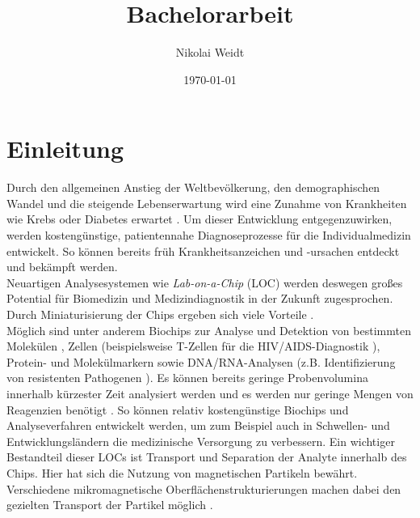 \documentclass[page,pdftex,12pt,a4paper,twoside,openright]{scrbook}
\author{Nikolai Weidt}
\date{\today}
\title{Bachelorarbeit}
\begin{document}
\maketitle
\setcounter{tocdepth}{2}
\tableofcontents


\chapter{Einleitung \label{sec-einleitung}}
\label{sec:org3c88a36}
Durch den allgemeinen Anstieg der Weltbevölkerung, den demographischen Wandel und die steigende Lebenserwartung wird eine Zunahme von Krankheiten wie Krebs oder Diabetes erwartet \cite{bray_global_2018,zhou_worldwide_2016}. Um dieser Entwicklung entgegenzuwirken, werden kostengünstige, patientennahe Diagnoseprozesse für die Individualmedizin entwickelt. So können bereits früh Krankheitsanzeichen und -ursachen entdeckt und bekämpft werden.\\

Neuartigen Analysesystemen wie \emph{Lab-on-a-Chip} (LOC) werden deswegen großes Potential für Biomedizin und Medizindiagnostik in der Zukunft zugesprochen. Durch Miniaturisierung der Chips ergeben sich viele Vorteile \cite{stone_microfluidics_2001,knight_honey_2002}.\\
Möglich sind unter anderem Biochips zur Analyse und Detektion von bestimmten Molekülen \cite{papadea_evaluation_2002}, Zellen (beispielsweise T-Zellen für die HIV/AIDS-Diagnostik \cite{cheng_microchip_2007}), Protein- und Molekülmarkern \cite{wang_self-powered_2010} sowie DNA/RNA-Analysen (z.B. Identifizierung von resistenten Pathogenen \cite{boehme_rapid_2010}). Es können bereits geringe Probenvolumina innerhalb kürzester Zeit analysiert werden und es werden nur geringe Mengen von Reagenzien benötigt \cite{chin_commercialization_2012}. So können relativ kostengünstige Biochips und Analyseverfahren entwickelt werden, um zum Beispiel auch in Schwellen- und Entwicklungsländern die medizinische Versorgung zu verbessern. Ein wichtiger Bestandteil dieser LOCs ist Transport und Separation der Analyte innerhalb des Chips. Hier hat sich die Nutzung von magnetischen Partikeln bewährt. Verschiedene mikromagnetische Oberflächenstrukturierungen machen dabei den gezielten Transport der Partikel möglich \cite{rampini_micromagnet_2016}.\\
\end{document}
